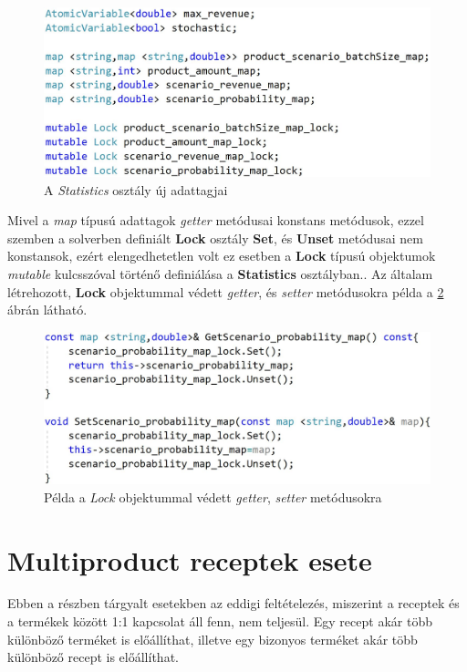 \begin{figure}[H]
\begin{center}
\includegraphics[scale=0.4]{StatisticsVariables}
\caption{A \textit{Statistics} osztály új adattagjai}
\label{StatisticsVariables}
\end{center}
\end{figure}
Mivel a \textit{map} típusú adattagok \textit{getter} metódusai konstans metódusok, ezzel szemben a solverben definiált \textbf{Lock} osztály \textbf{Set}, és \textbf{Unset} metódusai nem konstansok, ezért elengedhetetlen volt ez esetben a \textbf{Lock} típusú objektumok \textit{mutable} kulcsszóval történő definiálása a \textbf{Statistics} osztályban.. Az általam létrehozott, \textbf{Lock} objektummal védett \textit{getter}, és \textit{setter} metódusokra példa a \ref{GetterSetterLock} ábrán látható.
\begin{figure}[H]
\begin{center}
\includegraphics[scale=0.4]{GetterSetterLock}
\caption{Példa a \textit{Lock} objektummal védett \textit{getter}, \textit{setter} metódusokra}
\label{GetterSetterLock}
\end{center}
\end{figure}
\section{Multiproduct receptek esete} \label{extended_multiproduct}
Ebben a részben tárgyalt esetekben az eddigi feltételezés, miszerint a receptek és a termékek között 1:1 kapcsolat áll fenn, nem teljesül. Egy recept akár több különböző terméket is előállíthat, illetve egy bizonyos terméket akár több különböző recept is előállíthat. 